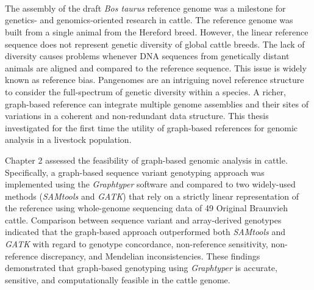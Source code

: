 \documentclass[11 pt, a4paper, notitlepage, twoside]{report}
\begin{document}
\newcommand*{\BuildingFromMainFile}{}



\iftwoside
\newpage
\thispagestyle{empty}
\ 
\newpage
\fi




\setcounter{tocdepth}{1}
\hypersetup{linkcolor=black}
\tableofcontents
{}
\newpage

\listoffigures 
{}
\newpage

\listoftables 
{}
\newpage

\section*{}
\thispagestyle{plain}

\setlength{\parskip}{\baselineskip}
\doublespacing
The assembly of the draft \emph{Bos taurus }reference genome was a milestone for genetics- and genomics-oriented research in cattle. The reference genome was built from a single animal from the Hereford breed. However, the linear reference sequence does not represent genetic diversity of global cattle breeds. The lack of diversity  causes problems whenever DNA sequences from genetically distant animals are aligned and compared to the reference sequence. This issue is widely known as reference bias. Pangenomes are an intriguing novel reference structure to consider the full-spectrum of genetic diversity within a species. A richer, graph-based reference can integrate multiple  genome assemblies and their sites of variations in a coherent and non-redundant data structure. This thesis investigated for the first time the utility of graph-based references for genomic analysis in a livestock population.

Chapter 2 assessed the feasibility of graph-based genomic analysis in cattle. Specifically, a graph-based sequence variant genotyping approach was implemented using the\emph{ Graphtyper} software and compared to two widely-used methods (\emph{SAMtools } and \emph{GATK}) that rely on a strictly linear representation of the reference using whole-genome sequencing data of 49 Original Braunvieh cattle. Comparison between sequence variant and array-derived genotypes indicated that the graph-based approach outperformed both \emph{SAMtools} and \emph{GATK} with regard to genotype concordance, non-reference sensitivity, non-reference discrepancy, and Mendelian inconsistencies. These findings demonstrated that graph-based genotyping using \emph{Graphtyper} is accurate, sensitive, and computationally feasible in the cattle genome. 
\end{document}
